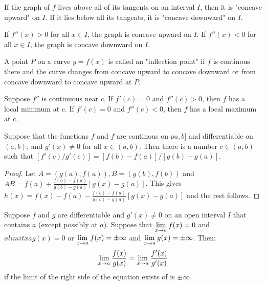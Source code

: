 \documentclass[a4paper,8pt]{article}
\begin{document}
\begin{outline}
    If the graph of \(f\) lives above all of its tangents on an interval \(I\), then it is "concave upward"
    on \(I\). If it lies below all its tangents, it is "concave downward" on \(I\).

    If \(f''(x) > 0\) for all \(x \in I\), the graph is concave upward on \(I\). If \(f''(x) < 0\) for all
    \(x \in I\), the graph is concave downward on \(I\).

    A point \(P\) on a curve \(y = f(x)\) is called an "inflection point" if \(f\) is continous there
    and the curve changes from concave upward to concave downward or from concave downward to concave upward at
    \(P\).

    Suppose \(f''\) is continuous near \(c\). If \(f'(c) = 0\) and \(f''(c) > 0\), then \(f\) has a local minimum at
    \(c\). If \(f'(c) = 0\) and \(f''(c) < 0\), then \(f\) has a local maximum at \(c\).

    Suppose that the functions \(f\) and \(f\) are continous on \(pa, b]\) and differentiable on \((a, b)\), and
    \(g'(x) \neq 0\) for all \(x \in (a, b)\). Then there is a number \(c \in (a, b)\) such that \([f'(c)/g'(c)] =
    [f(b)-f(a)]/[g(b)-g(a)]\).

    \begin{proof}
      Let \(A = (g(a), f(a)), B = (g(b), f(b))\) and \(AB = f(a) + \frac{f(b)-f(a)}{g(b)-g(a)}[g(x)-g(a)]\).
      This gives \(h(x) = f(x)-f(a)-\frac{f(b)-f(a)}{g(b)-g(a)}[g(x)-g(a)]\) and the rest follows.
    \end{proof}

    Suppose \(f\) and \(g\) are differentiable and \(g'(x) \neq 0\) on an open interval \(I\) that contains \(a\)
    (except possibly at \(a\)). Suppose that \(\lim\limits_{x\rightarrow a^{}}f(x) = 0\) and \(xlimit{x}{a}g(x) = 0\) or
    \(\lim\limits_{x\rightarrow a^{}}f(x) = \pm\infty\) and \(\lim\limits_{x\rightarrow a^{}}g(x) = \pm\infty\). Then:
    \[
      \lim\limits_{x\rightarrow a^{}}\frac{f(x)}{g(x)} = \lim\limits_{x\rightarrow a^{}}\frac{f'(x)}{g'(x)}
    \]
    if the limit of the right side of the equation exists of is \(\pm\infty\).


\end{outline}
\end{document}
